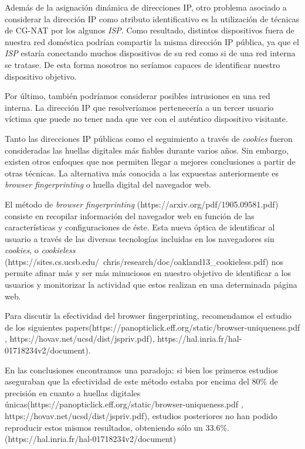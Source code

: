 Además de la asignación dinámica de direcciones IP, otro problema asociado a considerar la dirección IP como atributo identificativo es la utilización de técnicas de CG-NAT por los algunos \textit{ISP}. Como resultado, distintos dispositivos fuera de nuestra red doméstica podrían compartir la misma dirección IP pública, ya que el \textit{ISP} estaría conectando muchos dispositivos de su red como si de una red interna se tratase. De esta forma nosotros no seríamos capaces de identificar nuestro dispositivo objetivo. \par

Por último, también podríamos considerar posibles intrusiones en una red interna. La dirección IP que resolveríamos pertenecería a un tercer usuario víctima que puede no tener nada que ver con el auténtico dispositivo visitante.  \par

Tanto las direcciones IP públicas como el seguimiento a través de \textit{cookies} fueron consideradas las huellas digitales más fiables durante varios años. Sin embargo, existen otros enfoques que nos permiten llegar a mejores conclusiones a partir de otras técnicas. La alternativa más conocida a las expuestas anteriormente es \textit{browser fingerprinting} o huella digital del navegador web. \par

El método de \textit{browser fingerprinting} (https://arxiv.org/pdf/1905.09581.pdf) consiste en recopilar información del navegador web en función de las características y configuraciones de éste. Esta nueva óptica de identificar al usuario a través de las diversas tecnologías incluidas en los navegadores sin \textit{cookies}, o \textit{cookieless} (https://sites.cs.ucsb.edu/~chris/research/doc/oakland13_cookieless.pdf) nos permite afinar más y ser más minuciosos en nuestro objetivo de identificar a los usuarios y monitorizar la actividad que estos realizan en una determinada página web. \par 

Para discutir la efectividad del browser fingerprinting, recomendamos el estudio de los siguientes papers(https://panopticlick.eff.org/static/browser-uniqueness.pdf , https://hovav.net/ucsd/dist/jspriv.pdf), https://hal.inria.fr/hal-01718234v2/document). \par 

En las conclusiones encontramos una paradoja: si bien los primeros estudios aseguraban que la efectividad de este método estaba por encima del 80\% de precisión en cuanto a huellas digitales únicas(https://panopticlick.eff.org/static/browser-uniqueness.pdf , https://hovav.net/ucsd/dist/jspriv.pdf), estudios posteriores no han podido reproducir estos mismos resultados, obteniendo sólo un 33.6\%.(https://hal.inria.fr/hal-01718234v2/document) \par

